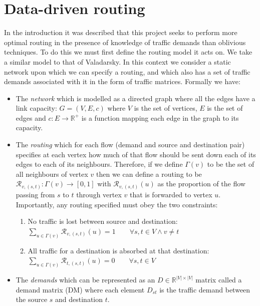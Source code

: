 \section{Data-driven routing}
\label{section:routing}
In the introduction it was described that this project seeks to perform more optimal routing in the presence of knowledge of traffic demands than oblivious techniques. To do this we must first define the routing model it acts on. We take a similar model to that of Valadarsky\cite{valadarsky2017learning}. In this context we consider a static network upon which we can specify a routing, and which also has a set of traffic demands associated with it in the form of traffic matrices. Formally we have:
\begin{itemize}
  \item The \emph{network} which is modelled as a directed graph where all the edges have a link capacity: $G=(V,E,c)$ where $V$ is the set of vertices, $E$ is the set of edges and $c : E \rightarrow \mathbb{R}^+$ is a function mapping each edge in the graph to its capacity.
  \item The \emph{routing} which for each flow (demand and source and destination pair) specifies at each vertex how much of that flow should be sent down each of its edges to each of its neighbours. Therefore, if we define $\Gamma(v)$ to be the set of all neighbours of vertex $v$ then we can define a routing to be $\mathcal{R}_{v,(s,t)} : \Gamma(v) \rightarrow [0,1]$ with $\mathcal{R}_{v,(s,t)}(u)$ as the proportion of the flow passing from $s$ to $t$ through vertex $v$ that is forwarded to vertex $u$. Importantly, any routing specified must obey the two constraints:
    \begin{enumerate}
      \item No traffic is lost between source and destination:\\
        $\sum_{u \in \Gamma(v)}{\mathcal{R}_{v,(s,t)}(u)} = 1 \qquad \forall s, t \in V \wedge v \neq t$
      \item All traffic for a destination is absorbed at that destination:\\
        $\sum_{u \in \Gamma(v)}{\mathcal{R}_{t,(s,t)}(u)} = 0 \qquad \forall s, t \in V$
    \end{enumerate}
  \item The \emph{demands} which can be represented as an $D \in \mathbb{R}^{|V|\times|V|}$ matrix called a demand matrix (DM) where each element $D_{st}$ is the traffic demand between the source $s$ and destination $t$.
\end{itemize}

